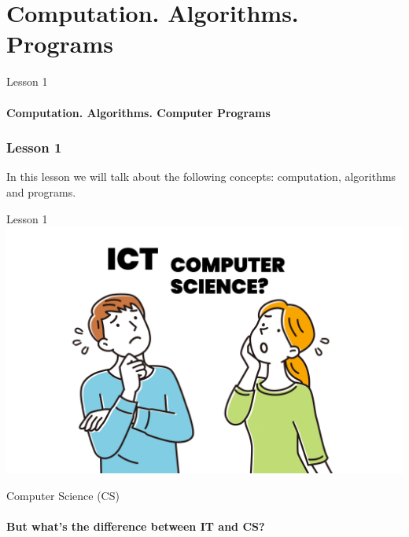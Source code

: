 \documentclass[aspectratio=1610]{beamer}
\begin{document}
\section{Computation. Algorithms. Programs}

\begin{frame}
\begin{center}
\Huge Lesson 1\\~\\
\textbf{Computation. Algorithms. Computer Programs}
\end{center}
\end{frame}


\begin{frame}
\frametitle{Lesson 1}

\Huge In this lesson we will talk about the following concepts:
 \alert{computation},
 \alert{algorithms} and
 \alert{programs}. 

\end{frame}


\begin{frame}{Lesson 1}{}
\includegraphics[scale=0.149]{Images/ictvscs.png}
\end{frame}


\begin{frame}
\begin{center}
\Huge Computer Science (CS)\\~\\
\textbf { But what's the difference between IT and CS? }
\end{center}
\end{frame}
\end{document}
